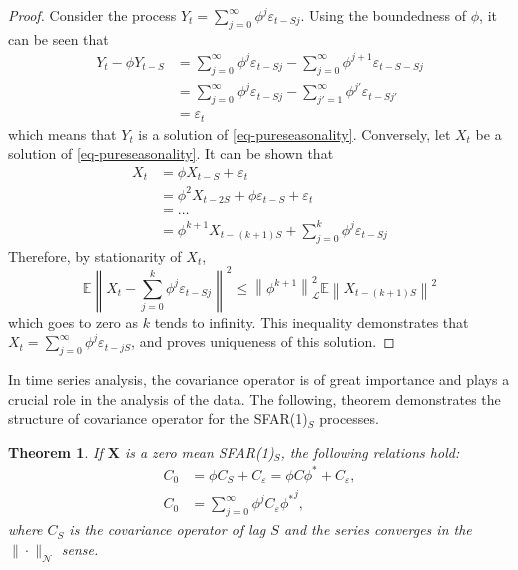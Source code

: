 \documentclass[11pt,a4paper]{article}
\newtheorem{Theorem} {Theorem}[section]
\numberwithin{equation}{section}
\newcommand{\E}{\mathbb{E}}
\begin{document}
\begin{proof}
  Consider the process $Y_t=\sum_{j=0}^\infty \phi^j\varepsilon_{t-Sj}$. Using the boundedness of $\phi$, it can be seen that
  \begin{align*}
    Y_t-\phi Y_{t-S}
      & = \sum_{j=0}^\infty \phi^j\varepsilon_{t-Sj}-\sum_{j=0}^\infty \phi^{j+1}\varepsilon_{t-S-Sj} \\
      & = \sum_{j=0}^\infty \phi^j\varepsilon_{t-Sj}-\sum_{j'=1}^\infty \phi^{j'}\varepsilon_{t-Sj'} \\
      & = \varepsilon_t
  \end{align*}
  which means that $Y_t$ is a solution of \eqref{eq-pureseasonality}. Conversely, let $X_t$ be a solution of \eqref{eq-pureseasonality}. It can be shown that
  \begin{align*}
      X_t & = \phi X_{t-S}+\varepsilon_t \\
          & = \phi^2 X_{t-2S}+\phi \varepsilon_{t-S}+\varepsilon_t \\
          & = \dots \\
          & = \phi^{k+1} X_{t-\left(k+1\right)S}+\sum_{j=0}^{k}\phi^j \varepsilon_{t-Sj}
  \end{align*}
  Therefore, by stationarity of $X_t$,
  $$
    \E\left\|X_t-\sum_{j=0}^{k}\phi^j \varepsilon_{t-Sj}\right\|^2 \leq \left\|\phi^{k+1}\right\|^2_\mathcal{L} \E\left\| X_{t-\left(k+1\right)S}\right\|^2
  $$
  which goes to zero as $k$ tends to infinity. This inequality demonstrates that $X_t=\sum_{j=0}^\infty\phi^j\varepsilon_{t-jS}$, and proves uniqueness of this solution.
\end{proof}
In time series analysis, the covariance operator is of great importance and plays a crucial role in the analysis of the data. The following, theorem demonstrates the structure of covariance operator for the SFAR(1)$_S$ processes.
\begin{Theorem}
  If $\bm{X}$ is a zero mean SFAR(1)$_S$, the following relations hold:
  \begin{align}
    C_0 & = \phi C_S+C_{\varepsilon}=\phi C\phi^*+C_{\varepsilon}, \\
    C_0 & = \sum_{j=0}^\infty\phi^j C_{\varepsilon}{\phi^*}^j,
  \end{align}
  where $C_S$ is the covariance operator of lag $S$ and the series converges in the $\|\cdot\|_{\mathcal{N}}$ sense.
\end{Theorem}
\end{document}
